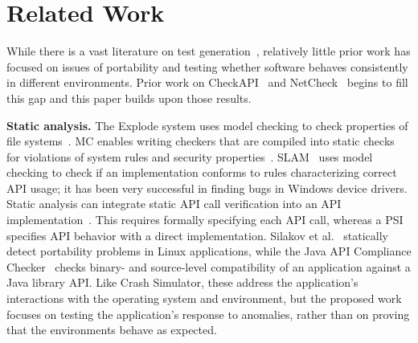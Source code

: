 \section{Related Work} \label{sec:related}

While there is a vast literature on test
generation~\cite{ammann2008introduction, mcminn2004search,
  puasuareanu2009survey, dias2007survey}, relatively little prior work
has focused on issues of portability and testing whether software
behaves consistently in different environments.  Prior work on
CheckAPI~\cite{rasley2015detecting} and
NetCheck~\cite{Zhuang_NSDI_2014} begins to fill this gap and this paper
builds upon those results.
%
%

\noindent
{\bf Static analysis. }
The Explode system uses model checking to check properties 
of file systems~\cite{Yang:2006:ELG:1298455.1298469}.
MC enables writing checkers that are compiled into
static checks for violations of system rules and security 
properties~\cite{Engler:2000:CSR:1251229.1251230, Ashcraft02usingprogrammer-written}.
SLAM~\cite{Ball_adecade, Ball:2002:SLP:503272.503274} 
uses model checking to check if an implementation
conforms to rules characterizing correct API usage;
it has been very successful in finding bugs
in Windows device drivers.
Static analysis can integrate static API call verification into an API
implementation~\cite{spinellis2007framework}. This requires formally specifying each API call, whereas
a PSI specifies API behavior with a direct implementation. Silakov et
al.~\cite{silakov2010improving} statically detect portability problems
in Linux applications, while the Java API Compliance
Checker~\cite{javacompliance-www}
checks binary- and source-level compatibility of an application against
a Java library API. 
Like Crash Simulator, these address the application's
interactions with the operating system and environment,
but the proposed work focuses on testing the application's
response to anomalies, rather than on proving that the
environments behave as expected.

